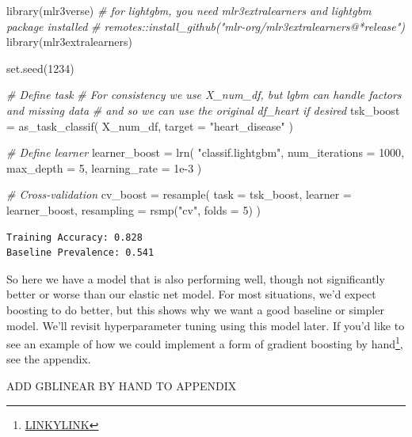 \documentclass[
  letterpaper,
]{krantz}
\newenvironment{Shaded}{}{}
\newcommand{\AttributeTok}[1]{\textcolor[rgb]{0.49,0.56,0.16}{#1}}
\newcommand{\CommentTok}[1]{\textcolor[rgb]{0.38,0.63,0.69}{\textit{#1}}}
\newcommand{\DecValTok}[1]{\textcolor[rgb]{0.25,0.63,0.44}{#1}}
\newcommand{\FloatTok}[1]{\textcolor[rgb]{0.25,0.63,0.44}{#1}}
\newcommand{\FunctionTok}[1]{\textcolor[rgb]{0.02,0.16,0.49}{#1}}
\newcommand{\NormalTok}[1]{#1}
\newcommand{\OtherTok}[1]{\textcolor[rgb]{0.00,0.44,0.13}{#1}}
\newcommand{\StringTok}[1]{\textcolor[rgb]{0.25,0.44,0.63}{#1}}
\DeclareRobustCommand{\href}[2]{#2\footnote{\url{#1}}}
\begin{document}
\begin{Shaded}
\begin{Highlighting}[]
\FunctionTok{library}\NormalTok{(mlr3verse)}
\CommentTok{\# for lightgbm, you need mlr3extralearners and lightgbm package installed}
\CommentTok{\# remotes::install\_github("mlr{-}org/mlr3extralearners@*release")}
\FunctionTok{library}\NormalTok{(mlr3extralearners) }

\FunctionTok{set.seed}\NormalTok{(}\DecValTok{1234}\NormalTok{)}

\CommentTok{\# Define task}
\CommentTok{\# For consistency we use X\_num\_df, but lgbm can handle factors and missing data }
\CommentTok{\# and so we can use the original df\_heart if desired}
\NormalTok{tsk\_boost }\OtherTok{=} \FunctionTok{as\_task\_classif}\NormalTok{(}
\NormalTok{    X\_num\_df,                 }
    \AttributeTok{target =} \StringTok{"heart\_disease"}
\NormalTok{)}

\CommentTok{\# Define learner}
\NormalTok{learner\_boost }\OtherTok{=} \FunctionTok{lrn}\NormalTok{(}
  \StringTok{"classif.lightgbm"}\NormalTok{,}
  \AttributeTok{num\_iterations =} \DecValTok{1000}\NormalTok{,}
  \AttributeTok{max\_depth =} \DecValTok{5}\NormalTok{,}
  \AttributeTok{learning\_rate =} \FloatTok{1e{-}3}
\NormalTok{)}


\CommentTok{\# Cross{-}validation}
\NormalTok{cv\_boost }\OtherTok{=} \FunctionTok{resample}\NormalTok{(}
    \AttributeTok{task       =}\NormalTok{ tsk\_boost,}
    \AttributeTok{learner    =}\NormalTok{ learner\_boost,}
    \AttributeTok{resampling =} \FunctionTok{rsmp}\NormalTok{(}\StringTok{"cv"}\NormalTok{, }\AttributeTok{folds =} \DecValTok{5}\NormalTok{)}
\NormalTok{)}
\end{Highlighting}
\end{Shaded}

\begin{verbatim}
Training Accuracy: 0.828
Baseline Prevalence: 0.541
\end{verbatim}

So here we have a model that is also performing well, though not
significantly better or worse than our elastic net model. For most
situations, we'd expect boosting to do better, but this shows why we
want a good baseline or simpler model. We'll revisit hyperparameter
tuning using this model later. If you'd like to see an example of how we
could implement a form of \href{LINKYLINK}{gradient boosting by hand},
see the appendix.

ADD GBLINEAR BY HAND TO APPENDIX
\end{document}
